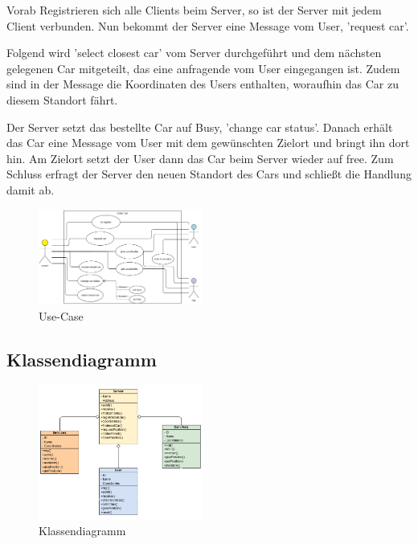 Vorab Registrieren sich alle Clients beim Server, so ist der Server mit jedem Client verbunden. Nun bekommt der Server eine Message vom User, 'request car'.

Folgend wird 'select closest car' vom Server durchgeführt und dem nächsten gelegenen Car mitgeteilt, das eine anfragende vom User eingegangen ist. Zudem sind in der Message die Koordinaten des Users enthalten, woraufhin das Car zu diesem Standort fährt.

Der Server setzt das bestellte Car auf Busy, 'change car status'.
Danach erhält das Car eine Message vom User mit dem gewünschten Zielort und bringt ihn dort hin. Am Zielort setzt der User dann das Car beim Server wieder auf free. Zum Schluss erfragt der Server den neuen Standort des Cars und schließt die Handlung damit ab.


\begin{figure}[htbp] 
  \centering
     \includegraphics[width=0.48\textwidth]{Use-Case_Server.png}
     \caption{Use-Case}
\end{figure}

\subsection{Klassendiagramm}


\begin{figure}[htbp] 
  \centering
     \includegraphics[width=0.48\textwidth]{Class_diagramm.png}
     \caption{Klassendiagramm}
\end{figure}
